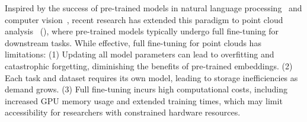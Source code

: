 
Inspired by the success of pre-trained models in natural language processing~\cite{devlin2018bert, brown2020language} and computer vision~\cite{he2020momentum, chen2020improved}, recent research has extended this paradigm to point cloud analysis~\cite{pang2022masked, yu2022point, zhang2022point, afham2022crosspoint} (), where pre-trained models typically undergo full fine-tuning for downstream tasks. While effective, full fine-tuning for point clouds has limitations: (1) Updating all model parameters can lead to overfitting and catastrophic forgetting, diminishing the benefits of pre-trained embeddings. (2) Each task and dataset requires its own model, leading to storage inefficiencies as demand grows. (3) Full fine-tuning incurs high computational costs, including increased GPU memory usage and extended training times, which may limit accessibility for researchers with constrained hardware resources.

